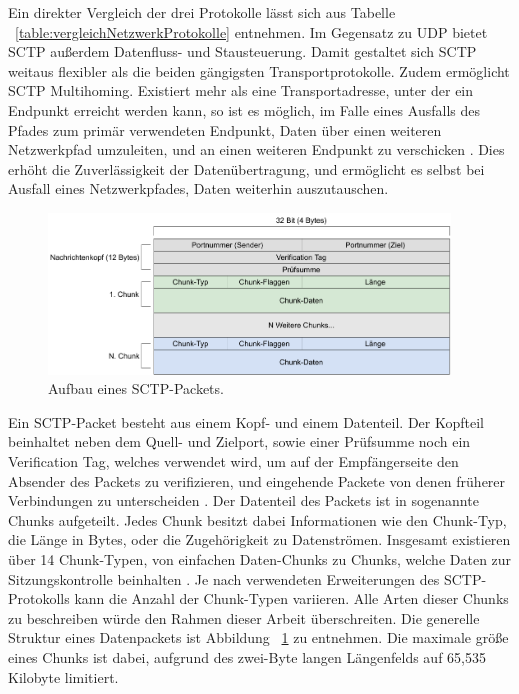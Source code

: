Ein direkter Vergleich der drei Protokolle lässt sich aus Tabelle ~\ref{table:vergleichNetzwerkProtokolle} entnehmen. Im Gegensatz zu \acs{UDP} bietet \acs{SCTP} außerdem Datenfluss- und Stausteuerung. Damit gestaltet sich \acs{SCTP} weitaus flexibler als die beiden gängigsten Transportprotokolle. Zudem ermöglicht \acs{SCTP} Multihoming. Existiert mehr als eine Transportadresse, unter der ein Endpunkt erreicht werden kann, so ist es möglich, im Falle eines Ausfalls des Pfades zum primär verwendeten Endpunkt, Daten über einen weiteren Netzwerkpfad umzuleiten, und an einen weiteren Endpunkt zu verschicken \cite{sctpRFC, multihoming}. Dies erhöht die Zuverlässigkeit der Datenübertragung, und ermöglicht es selbst bei Ausfall eines Netzwerkpfades, Daten weiterhin auszutauschen.\par

\begin{figure}[h]
\centering
\includegraphics[width=0.95\textwidth]{bilder/PDF_SVG/SCTP_PACKET.pdf}
\caption{Aufbau eines \acs{SCTP}-Packets.}
\label{fig:sctpPacket}
\end{figure}

Ein \acs{SCTP}-Packet besteht aus einem Kopf- und einem Datenteil. Der Kopfteil beinhaltet neben dem Quell- und Zielport, sowie einer Prüfsumme noch ein \glqq{}Verification Tag\grqq{}, welches verwendet wird, um auf der Empfängerseite den Absender des Packets zu verifizieren, und eingehende Packete von denen früherer Verbindungen zu unterscheiden \cite{sctpRFC}.
Der Datenteil des Packets ist in sogenannte \glqq{}Chunks\grqq{}  aufgeteilt. Jedes \glqq{}Chunk\grqq{} besitzt dabei Informationen wie den Chunk-Typ, die Länge in Bytes, oder die Zugehörigkeit zu Datenströmen. Insgesamt existieren über 14 Chunk-Typen, von einfachen Daten-Chunks zu Chunks, welche Daten zur Sitzungskontrolle beinhalten \cite{sctpRFC}. Je nach verwendeten Erweiterungen des \acs{SCTP}-Protokolls kann die Anzahl der Chunk-Typen variieren. Alle Arten dieser \glqq Chunks\grqq{} zu beschreiben würde den Rahmen dieser Arbeit überschreiten. Die generelle Struktur eines Datenpackets ist Abbildung ~\ref{fig:sctpPacket} zu entnehmen. Die maximale größe eines \glqq{}Chunks\grqq{} ist dabei, aufgrund des zwei-Byte langen Längenfelds auf 65,535 Kilobyte limitiert.

